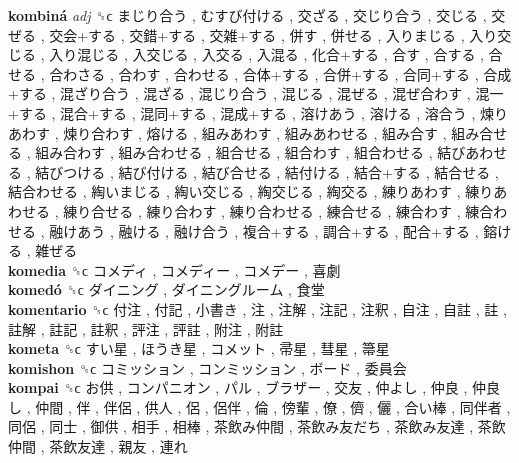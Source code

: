 \textbf{kombiná} \emph{adj}  ␝ϲ   まじり合う ,  むすび付ける ,  交ざる ,  交じり合う ,  交じる ,  交ぜる ,  交会+する ,  交錯+する ,  交雑+する ,  併す ,  併せる ,  入りまじる ,  入り交じる ,  入り混じる ,  入交じる ,  入交る ,  入混る ,  化合+する ,  合す ,  合する ,  合せる ,  合わさる ,  合わす ,  合わせる ,  合体+する ,  合併+する ,  合同+する ,  合成+する ,  混ざり合う ,  混ざる ,  混じり合う ,  混じる ,  混ぜる ,  混ぜ合わす ,  混一+する ,  混合+する ,  混同+する ,  混成+する ,  溶けあう ,  溶ける ,  溶合う ,  煉りあわす ,  煉り合わす ,  熔ける ,  組みあわす ,  組みあわせる ,  組み合す ,  組み合せる ,  組み合わす ,  組み合わせる ,  組合せる ,  組合わす ,  組合わせる ,  結びあわせる ,  結びつける ,  結び付ける ,  結び合せる ,  結付ける ,  結合+する ,  結合せる ,  結合わせる ,  綯いまじる ,  綯い交じる ,  綯交じる ,  綯交る ,  練りあわす ,  練りあわせる ,  練り合せる ,  練り合わす ,  練り合わせる ,  練合せる ,  練合わす ,  練合わせる ,  融けあう ,  融ける ,  融け合う ,  複合+する ,  調合+する ,  配合+する ,  鎔ける ,  雑ぜる   \\
\textbf{komedia} ␝ϲ   コメディ ,  コメディー ,  コメデー ,  喜劇   \\
\textbf{komedó} ␝ϲ   ダイニング ,  ダイニングルーム ,  食堂   \\
\textbf{komentario} ␝ϲ   付注 ,  付記 ,  小書き ,  注 ,  注解 ,  注記 ,  注釈 ,  自注 ,  自註 ,  註 ,  註解 ,  註記 ,  註釈 ,  評注 ,  評註 ,  附注 ,  附註   \\
\textbf{kometa} ␝ϲ   すい星 ,  ほうき星 ,  コメット ,  帚星 ,  彗星 ,  箒星   \\
\textbf{komishon} ␝ϲ   コミッション ,  コンミッション ,  ボード ,  委員会   \\
\textbf{kompai} ␝ϲ   お供 ,  コンパニオン ,  パル ,  ブラザー ,  交友 ,  仲よし ,  仲良 ,  仲良し ,  仲間 ,  伴 ,  伴侶 ,  供人 ,  侶 ,  侶伴 ,  倫 ,  傍輩 ,  僚 ,  儕 ,  儷 ,  合い棒 ,  同伴者 ,  同侶 ,  同士 ,  御供 ,  相手 ,  相棒 ,  茶飲み仲間 ,  茶飲み友だち ,  茶飲み友達 ,  茶飲仲間 ,  茶飲友達 ,  親友 ,  連れ   \\
